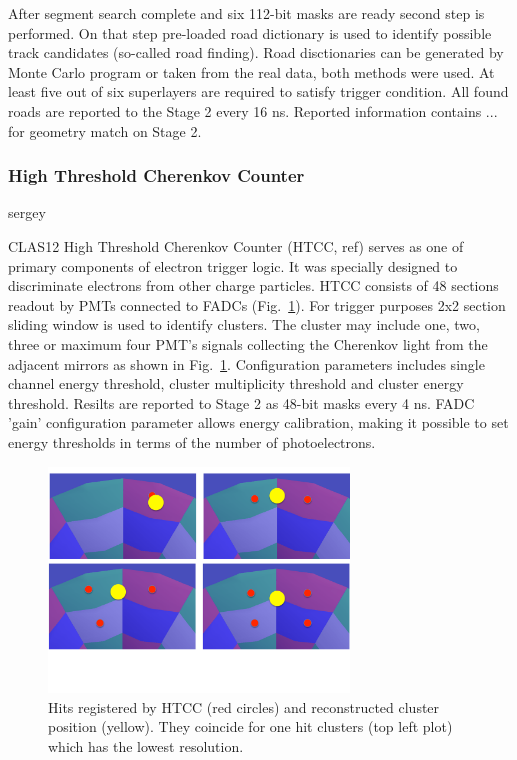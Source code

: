 After segment search complete and six 112-bit masks are ready second step is performed. On that step pre-loaded road dictionary is used to identify possible track candidates (so-called road finding). Road disctionaries can be generated by Monte Carlo program or taken from the real data, both methods were used. At least five out of six superlayers are required to satisfy trigger condition. All found roads are reported to the Stage 2 every 16 ns. Reported information contains ... for geometry match on Stage 2.


\subsubsection{High Threshold Cherenkov Counter} sergey
\label{sec:HTCC}

CLAS12 High Threshold Cherenkov Counter (HTCC, ref) serves as one of primary components of electron trigger logic. It was specially designed to discriminate electrons from other charge particles. HTCC consists of 48 sections readout by PMTs connected to FADCs (Fig.~\ref{fig:multihitHTCC}). For trigger purposes 2x2 section sliding window is used to identify clusters. The cluster may include one, two, three or maximum four PMT's signals collecting the Cherenkov light from the adjacent mirrors as shown in  Fig.~\ref{fig:multihitHTCC}. Configuration parameters includes single channel energy threshold, cluster multiplicity threshold and cluster energy threshold. Resilts are reported to Stage 2 as 48-bit masks every 4 ns. FADC 'gain' configuration parameter allows energy calibration, making it possible to set energy thresholds in terms of the number of photoelectrons.


\begin{figure}[htp]
	\begin{center}
		\centering
		\includegraphics[width=8cm]{img/multiHits.pdf}
		\caption{Hits registered by HTCC (red circles) and reconstructed cluster position (yellow). They coincide for one hit clusters (top left plot) which has the lowest resolution.}
		\label{fig:multihitHTCC}
	\end{center}
\end{figure} 


